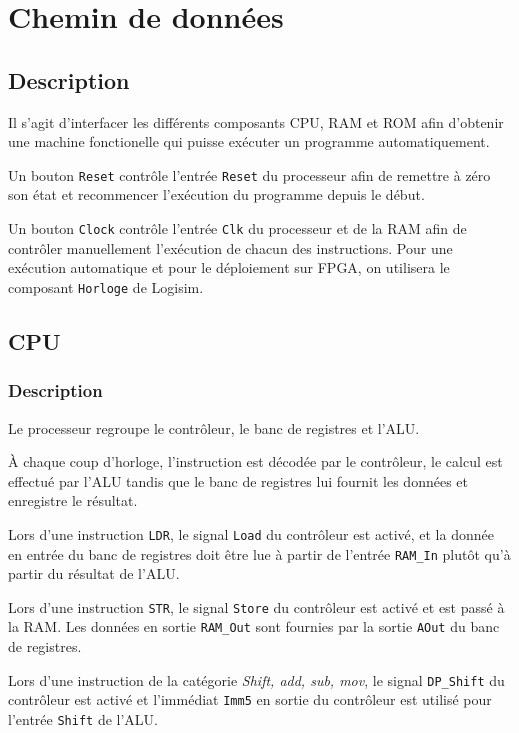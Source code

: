 \documentclass{article}
\begin{document}
    \section{Chemin de données}
    \label{sec:DataPath}

    \subsection{Description}

    Il s'agit d'interfacer les différents composants CPU, RAM et ROM afin d'obtenir une machine fonctionelle qui puisse exécuter un programme automatiquement.

    Un bouton \texttt{Reset} contrôle l'entrée \texttt{Reset} du processeur afin de remettre à zéro son état et recommencer l'exécution du programme depuis le début.

    Un bouton \texttt{Clock} contrôle l'entrée \texttt{Clk} du processeur et de la RAM afin de contrôler manuellement l'exécution de chacun des instructions.
    Pour une exécution automatique et pour le déploiement sur FPGA, on utilisera le composant \texttt{Horloge} de Logisim.

    \subsection{CPU}

    \subsubsection{Description}

    Le processeur regroupe le contrôleur, le banc de registres et l'ALU.

    À chaque coup d'horloge, l'instruction est décodée par le contrôleur, le calcul est effectué par l'ALU tandis que le banc de registres lui fournit les données et enregistre le résultat.

    Lors d'une instruction \texttt{LDR}, le signal \texttt{Load} du contrôleur est activé, et la donnée en entrée du banc de registres doit être lue à partir de l'entrée \texttt{RAM\_In} plutôt qu'à partir du résultat de l'ALU.

    Lors d'une instruction \texttt{STR}, le signal \texttt{Store} du contrôleur est activé et est passé à la RAM. Les données en sortie \texttt{RAM\_Out} sont fournies par la sortie \texttt{AOut} du banc de registres.

    Lors d'une instruction de la catégorie \textit{Shift, add, sub, mov}, le signal \texttt{DP\_Shift} du contrôleur est activé et l'immédiat \texttt{Imm5} en sortie du contrôleur est utilisé pour l'entrée \texttt{Shift} de l'ALU.
\end{document}
